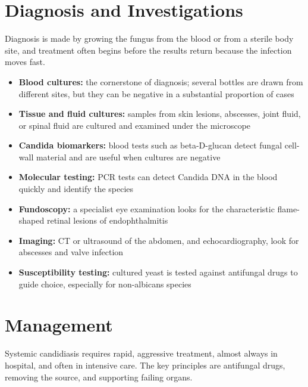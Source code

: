 \section*{Diagnosis and Investigations}
Diagnosis is made by growing the fungus from the blood or from a sterile body site, and treatment often begins before the results return because the infection moves fast.

\begin{itemize}
    \item \textbf{Blood cultures:} the cornerstone of diagnosis; several bottles are drawn from different sites, but they can be negative in a substantial proportion of cases
    \item \textbf{Tissue and fluid cultures:} samples from skin lesions, abscesses, joint fluid, or spinal fluid are cultured and examined under the microscope
    \item \textbf{Candida biomarkers:} blood tests such as beta-D-glucan detect fungal cell-wall material and are useful when cultures are negative
    \item \textbf{Molecular testing:} PCR tests can detect Candida DNA in the blood quickly and identify the species
    \item \textbf{Fundoscopy:} a specialist eye examination looks for the characteristic flame-shaped retinal lesions of endophthalmitis
    \item \textbf{Imaging:} CT or ultrasound of the abdomen, and echocardiography, look for abscesses and valve infection
    \item \textbf{Susceptibility testing:} cultured yeast is tested against antifungal drugs to guide choice, especially for non-albicans species
\end{itemize}

\section*{Management}
Systemic candidiasis requires rapid, aggressive treatment, almost always in hospital, and often in intensive care. The key principles are antifungal drugs, removing the source, and supporting failing organs.

